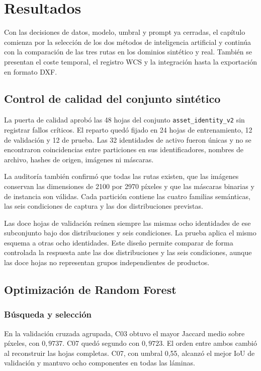 \chapter{Resultados}
\label{cap:resultados}

Con las decisiones de datos, modelo, umbral y prompt ya cerradas, el capítulo comienza por la selección de los dos métodos de inteligencia artificial y continúa con la comparación de las tres rutas en los dominios sintético y real. También se presentan el coste temporal, el registro WCS y la integración hasta la exportación en formato DXF.

\section{Control de calidad del conjunto sintético}

La puerta de calidad aprobó las 48 hojas del conjunto \texttt{asset\_identity\_v2} sin registrar fallos críticos. El reparto quedó fijado en 24 hojas de entrenamiento, 12 de validación y 12 de prueba. Las 32 identidades de activo fueron únicas y no se encontraron coincidencias entre particiones en sus identificadores, nombres de archivo, hashes de origen, imágenes ni máscaras.

La auditoría también confirmó que todas las rutas existen, que las imágenes conservan las dimensiones de 2100 por 2970 píxeles y que las máscaras binarias y de instancia son válidas. Cada partición contiene las cuatro familias semánticas, las seis condiciones de captura y las dos distribuciones previstas.

Las doce hojas de validación reúnen siempre las mismas ocho identidades de ese subconjunto bajo dos distribuciones y seis condiciones. La prueba aplica el mismo esquema a otras ocho identidades. Este diseño permite comparar de forma controlada la respuesta ante las dos distribuciones y las seis condiciones, aunque las doce hojas no representan grupos independientes de productos.

\section{Optimización de Random Forest}

\subsection{Búsqueda y selección}

En la validación cruzada agrupada, C03 obtuvo el mayor Jaccard medio sobre píxeles, con $0{,}9737$. C07 quedó segundo con $0{,}9723$. El orden entre ambos cambió al reconstruir las hojas completas. C07, con umbral 0,55, alcanzó el mejor IoU de validación y mantuvo ocho componentes en todas las láminas.

